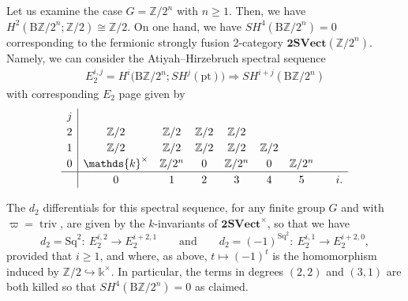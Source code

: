 \documentclass[pdftex]{sigma}
\numberwithin{equation}{section}
\begin{document}
\begin{Example}\label{ex:FSF2CZ/2}
Let us examine the case $G=\mathbb{Z}/2^n$ with $n\geq 1$. Then, we have $H^2(\mathrm{B}\mathbb{Z}/2^n;\mathbb{Z}/2)\allowbreak\cong\mathbb{Z}/2$. On one hand, we have $SH^{4}(\mathrm{B}\mathbb{Z}/2^n)=0$ corresponding to the fermionic strongly fusion 2-category $\mathbf{2SVect}(\mathbb{Z}/2^n)$. Namely, we can consider the Atiyah--Hirzebruch spectral sequence
\begin{gather*}
E_2^{i,j}=H^i\big(\mathrm{B}\mathbb{Z}/2^n;SH^j(\mathrm{pt})\big)\Rightarrow SH^{i+j}(\mathrm{B}\mathbb{Z}/2^n)
\end{gather*}
 with corresponding $E_2$ page given by
\begin{gather*}\renewcommand{\arraystretch}{1.2}\begin{array}{c|ccccccc}
 j \\
 2 & \mathbb{Z}/2 & \mathbb{Z}/2 & \mathbb{Z}/2 & \mathbb{Z}/2 \\
 1 & \mathbb{Z}/2 & \mathbb{Z}/2 & \mathbb{Z}/2 & \mathbb{Z}/2 & \mathbb{Z}/2\\
 0 & \mathds{k}^{\times}& \mathbb{Z}/2^n & 0 & \mathbb{Z}/2^n & 0 & \mathbb{Z}/2^n \\
 \hline
 & 0 & 1 & 2 & 3 & 4 & 5 & \quad i.
\end{array}\end{gather*}

The $d_2$ differentials for this spectral sequence, for any finite group $G$ and with $\varpi=\operatorname{triv}$, are given by the $k$-invariants of $\mathbf{2SVect}^{\times}$, so that we have
\begin{equation}\label{eq:untwistedd2s}
d_2=\mathrm{Sq}^2\colon\ E^{i,2}_2\rightarrow E^{i+2,1}_2\qquad \textrm{and}\qquad d_2=(-1)^{\mathrm{Sq}^2}\colon\ E^{i,1}_2\rightarrow E^{i+2,0}_2,
\end{equation}
provided that $i\geq 1$, and where, as above, $t\mapsto (-1)^{t}$ is the homomorphism induced by $\mathbb{Z}/2\hookrightarrow \mathds{k}^{\times}$. In particular, the terms in degrees $(2,2)$ and $(3,1)$ are both killed so that $SH^{4}(\mathrm{B}\mathbb{Z}/2^n)=0$ as claimed.


\end{Example}
\end{document}
